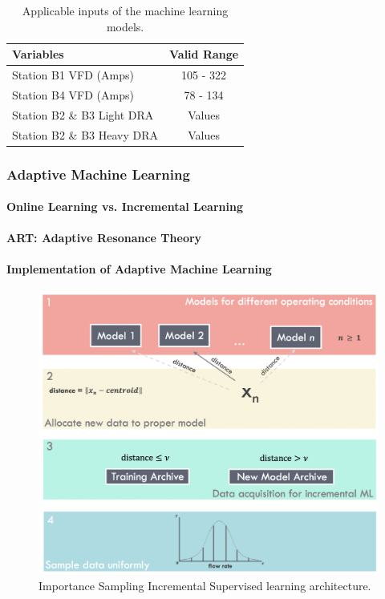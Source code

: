 \begin{table}[h]
    \centering
    {
    \begin{tabular}{ p{6cm} | c }
        Variables                               &  Valid Range            \\
        \hline
        Station B1 VFD (Amps)                     &      105 - 322          \\
        Station B4 VFD (Amps)                  &      78 - 134           \\ 
        Station B2 \& B3 Light DRA             &      Values            \\
        Station B2 \& B3 Heavy DRA             &     Values            \\
    \end{tabular}}
    \caption{Applicable inputs of the machine learning models.}
    \label{tab:08InputConst}
\end{table}

\subsubsection{Adaptive Machine Learning}


\paragraph{Online Learning vs. Incremental Learning}
\paragraph{ART: Adaptive Resonance Theory}
\paragraph{Implementation of Adaptive Machine Learning}

\begin{figure}
    \centering
    \includegraphics[width=\textwidth]{images/suncor/08IncrementalLearning.png}
    \caption{Importance Sampling Incremental Supervised learning architecture.}
    \label{fig:08ART}
\end{figure}

